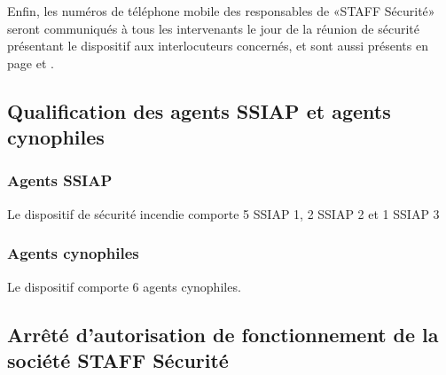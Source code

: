 \documentclass[hidelinks, paper=a4, fontsize=13pt]{report}
\begin{document}
Enfin, les numéros de téléphone mobile des responsables de «STAFF Sécurité» seront communiqués à tous les intervenants le jour de la réunion de sécurité présentant le dispositif aux interlocuteurs concernés, et sont aussi présents en page \pageref{refTelPC} et \pageref{refTelOrgas}.

\subsection{Qualification des agents SSIAP et agents cynophiles}


\subsubsection{Agents SSIAP}

Le dispositif de sécurité incendie comporte 5 SSIAP 1, 2 SSIAP 2  et 1 SSIAP 3

\subsubsection{Agents cynophiles}

Le dispositif comporte 6 agents cynophiles.

\subsection{Arrêté d’autorisation de fonctionnement de la société STAFF Sécurité}
\end{document}
